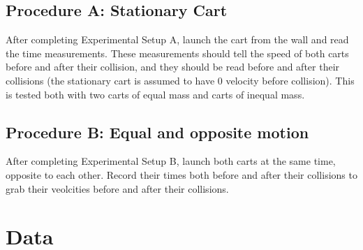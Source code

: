 \documentclass[12pt]{article}
\begin{document}
        \subsection{Procedure A: Stationary Cart}
            \par After completing Experimental Setup A, launch the cart from the 
            wall and read the time measurements. These measurements should tell
            the speed of both carts before and after their collision, and they
            should be read before and after their collisions (the stationary
            cart is assumed to have 0 velocity before collision). This is tested
            both with two carts of equal mass and carts of inequal mass.
        \subsection{Procedure B: Equal and opposite motion}
            \par After completing Experimental Setup B, launch both carts at the
            same time, opposite to each other. Record their times both before
            and after their collisions to grab their veolcities before and after
            their collisions.

        \section{Data}
\end{document}
